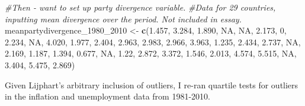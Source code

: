 \documentclass[11pt, oneside]{article}   	%
\newenvironment{Shaded}{\begin{snugshade}}{\end{snugshade}}
\newcommand{\CommentTok}[1]{\textcolor[rgb]{0.56,0.35,0.01}{\textit{#1}}}
\newcommand{\DataTypeTok}[1]{\textcolor[rgb]{0.13,0.29,0.53}{#1}}
\newcommand{\DecValTok}[1]{\textcolor[rgb]{0.00,0.00,0.81}{#1}}
\newcommand{\FloatTok}[1]{\textcolor[rgb]{0.00,0.00,0.81}{#1}}
\newcommand{\KeywordTok}[1]{\textcolor[rgb]{0.13,0.29,0.53}{\textbf{#1}}}
\newcommand{\NormalTok}[1]{#1}
\newcommand{\OperatorTok}[1]{\textcolor[rgb]{0.81,0.36,0.00}{\textbf{#1}}}
\newcommand{\OtherTok}[1]{\textcolor[rgb]{0.56,0.35,0.01}{#1}}
\newcommand{\StringTok}[1]{\textcolor[rgb]{0.31,0.60,0.02}{#1}}
\begin{document}
\begin{Shaded}
\begin{Highlighting}[]
\CommentTok{#Then - want to set up party divergence variable. }
\CommentTok{#Data for 29 countries, inputting mean divergence over the period. Not included in essay.}
\NormalTok{meanpartydivergence_}\DecValTok{1980}\NormalTok{_}\DecValTok{2010}\NormalTok{ <-}\StringTok{ }\KeywordTok{c}\NormalTok{(}\FloatTok{1.457}\NormalTok{, }\FloatTok{3.284}\NormalTok{, }\FloatTok{1.890}\NormalTok{, }\OtherTok{NA}\NormalTok{, }\OtherTok{NA}\NormalTok{, }\FloatTok{2.173}\NormalTok{, }\DecValTok{0}\NormalTok{, }\FloatTok{2.234}\NormalTok{, }\OtherTok{NA}\NormalTok{, }\FloatTok{4.020}\NormalTok{, }\FloatTok{1.977}\NormalTok{,}
                                   \FloatTok{2.404}\NormalTok{, }\FloatTok{2.963}\NormalTok{, }\FloatTok{2.983}\NormalTok{, }\FloatTok{2.966}\NormalTok{, }\FloatTok{3.963}\NormalTok{, }\FloatTok{1.235}\NormalTok{, }\FloatTok{2.434}\NormalTok{, }\FloatTok{2.737}\NormalTok{, }\OtherTok{NA}\NormalTok{, }\FloatTok{2.169}\NormalTok{,}
                                   \FloatTok{1.187}\NormalTok{, }\FloatTok{1.394}\NormalTok{, }\FloatTok{0.677}\NormalTok{, }\OtherTok{NA}\NormalTok{, }\FloatTok{1.22}\NormalTok{, }\FloatTok{2.872}\NormalTok{, }\FloatTok{3.372}\NormalTok{, }\FloatTok{1.546}\NormalTok{, }\FloatTok{2.013}\NormalTok{, }\FloatTok{4.574}\NormalTok{,}
                                   \FloatTok{5.515}\NormalTok{, }\OtherTok{NA}\NormalTok{, }\FloatTok{3.404}\NormalTok{, }\FloatTok{5.475}\NormalTok{, }\FloatTok{2.869}\NormalTok{)}
\end{Highlighting}
\end{Shaded}

Given Lijphart's arbitrary inclusion of outliers, I re-ran quartile
tests for outliers in the inflation and unemployment data from
1981-2010.

\begin{Shaded}
\end{Shaded}
\end{document}

